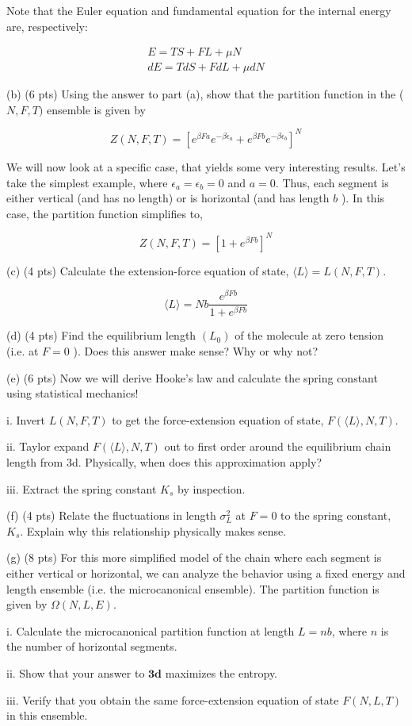 \documentclass[10pt]{article}
\begin{document}
Note that the Euler equation and fundamental equation for the internal energy are, respectively:

$$
\begin{gathered}
E=T S+F L+\mu N \\
d E=T d S+F d L+\mu d N
\end{gathered}
$$

(b) (6 pts) Using the answer to part (a), show that the partition function in the ( $N, F, T)$ ensemble is given by

$$
Z(N, F, T)=\left[e^{\beta F a} e^{-\beta \epsilon_{a}}+e^{\beta F b} e^{-\beta \epsilon_{b}}\right]^{N}
$$

We will now look at a specific case, that yields some very interesting results. Let's take the simplest example, where $\epsilon_{a}=\epsilon_{b}=0$ and $a=0$. Thus, each segment is either vertical (and has no length) or is horizontal (and has length $b$ ). In this case, the partition function simplifies to,

$$
Z(N, F, T)=\left[1+e^{\beta F b}\right]^{N}
$$

(c) (4 pts) Calculate the extension-force equation of state, $\langle L\rangle=L(N, F, T)$.

$$
\langle L\rangle=N b \frac{e^{\beta F b}}{1+e^{\beta F b}}
$$

(d) (4 pts) Find the equilibrium length $\left(L_{0}\right)$ of the molecule at zero tension (i.e. at $F=0$ ). Does this answer make sense? Why or why not?

(e) (6 pts) Now we will derive Hooke's law and calculate the spring constant using statistical mechanics!

i. Invert $L(N, F, T)$ to get the force-extension equation of state, $F(\langle L\rangle, N, T)$.

ii. Taylor expand $F(\langle L\rangle, N, T)$ out to first order around the equilibrium chain length from 3d. Physically, when does this approximation apply?

iii. Extract the spring constant $K_{s}$ by inspection.

(f) (4 pts) Relate the fluctuations in length $\sigma_{L}^{2}$ at $F=0$ to the spring constant, $K_{s}$. Explain why this relationship physically makes sense.

(g) (8 pts) For this more simplified model of the chain where each segment is either vertical or horizontal, we can analyze the behavior using a fixed energy and length ensemble (i.e. the microcanonical ensemble). The partition function is given by $\Omega(N, L, E)$.

i. Calculate the microcanonical partition function at length $L=n b$, where $n$ is the number of horizontal segments.

ii. Show that your answer to $\mathbf{3 d}$ maximizes the entropy.

iii. Verify that you obtain the same force-extension equation of state $F(N, L, T)$ in this ensemble.
\end{document}
